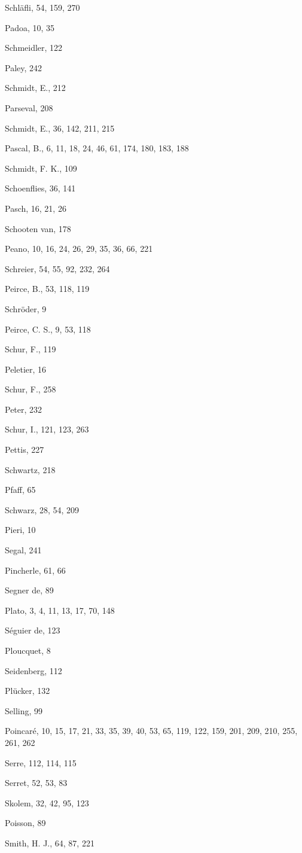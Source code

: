 Schläfli, 54, 159, 270

Padoa, 10, 35

Schmeidler, 122

Paley, 242

Schmidt, E., 212

Parseval, 208

Schmidt, E., 36, 142, 211, 215

Pascal, B., 6, 11, 18, 24, 46, 61, 174, 180, 183, 188

Schmidt, F. K., 109

Schoenflies, 36, 141

Pasch, 16, 21, 26

Schooten van, 178

Peano, 10, 16, 24, 26, 29, 35, 36, 66, 221

Schreier, 54, 55, 92, 232, 264

Peirce, B., 53, 118, 119

Schröder, 9

Peirce, C. S., 9, 53, 118

Schur, F., 119

Peletier, 16

Schur, F., 258

Peter, 232

Schur, I., 121, 123, 263

Pettis, 227

Schwartz, 218

Pfaff, 65

Schwarz, 28, 54, 209

Pieri, 10

Segal, 241

Pincherle, 61, 66

Segner de, 89

Plato, 3, 4, 11, 13, 17, 70, 148

Séguier de, 123

Ploucquet, 8

Seidenberg, 112

Plücker, 132

Selling, 99

Poincaré, 10, 15, 17, 21, 33, 35, 39, 40, 53, 65, 119, 122, 159, 201, 209, 210, 255, 261, 262

Serre, 112, 114, 115

Serret, 52, 53, 83

Skolem, 32, 42, 95, 123

Poisson, 89

Smith, H. J., 64, 87, 221


